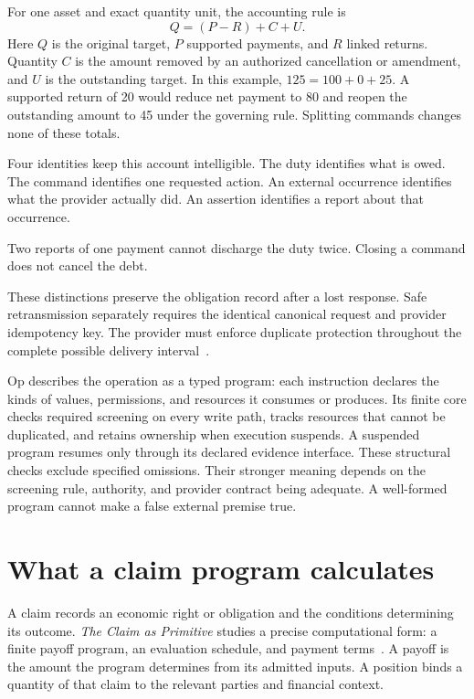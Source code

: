 \documentclass{momentum}
\begin{document}
For one asset and exact quantity unit, the accounting rule is
\[
 Q=(P-R)+C+U.
\]
Here $Q$ is the original target, $P$ supported payments, and $R$ linked returns. Quantity $C$ is the amount removed by an authorized cancellation or amendment, and $U$ is the outstanding target. In this example, $125=100+0+25$. A supported return of 20 would reduce net payment to 80 and reopen the outstanding amount to 45 under the governing rule. Splitting commands changes none of these totals.

Four identities keep this account intelligible. The duty identifies what is owed. The command identifies one requested action. An external occurrence identifies what the provider actually did. An assertion identifies a report about that occurrence.

Two reports of one payment cannot discharge the duty twice. Closing a command does not cancel the debt.

These distinctions preserve the obligation record after a lost response. Safe retransmission separately requires the identical canonical request and provider idempotency key. The provider must enforce duplicate protection throughout the complete possible delivery interval~\cite[Section~5.13]{op}.

Op describes the operation as a typed program: each instruction declares the kinds of values, permissions, and resources it consumes or produces. Its finite core checks required screening on every write path, tracks resources that cannot be duplicated, and retains ownership when execution suspends. A suspended program resumes only through its declared evidence interface. These structural checks exclude specified omissions. Their stronger meaning depends on the screening rule, authority, and provider contract being adequate. A well-formed program cannot make a false external premise true.

\section{What a claim program calculates}
\label{sec:calculation}

A claim records an economic right or obligation and the conditions determining its outcome. \emph{The Claim as Primitive} studies a precise computational form: a finite payoff program, an evaluation schedule, and payment terms~\cite{claim}. A payoff is the amount the program determines from its admitted inputs. A position binds a quantity of that claim to the relevant parties and financial context.
\end{document}
